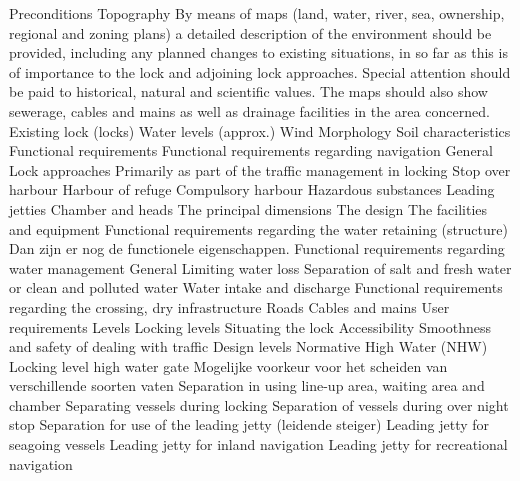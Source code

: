  

Preconditions
Topography
By means of maps (land, water, river, sea, ownership, regional and zoning plans) a detailed description
of the environment should be provided, including any planned changes to existing situations, in so far
as this is of importance to the lock and adjoining lock approaches. Special attention should be paid to
historical, natural and scientific values. The maps should also show sewerage, cables and mains as well
as drainage facilities in the area concerned.
Existing lock (locks)
Water levels (approx.)
Wind
Morphology
Soil characteristics
Functional requirements
Functional requirements regarding navigation
General
Lock approaches
Primarily as part of the traffic management in locking
Stop over harbour
Harbour of refuge
Compulsory harbour
Hazardous substances
Leading jetties
Chamber and heads
The principal dimensions
The design
The facilities and equipment
Functional requirements regarding the water retaining (structure)
\newline \indent Dan zijn er nog de functionele eigenschappen.
 Functional requirements regarding water management
General
Limiting water loss
Separation of salt and fresh water or clean and polluted water
Water intake and discharge
\newline \indent Functional requirements regarding the crossing, dry infrastructure
Roads
Cables and mains
\newline \indent  User requirements
\newline \indent Levels
Locking levels
Situating the lock
Accessibility
Smoothness and safety of dealing with traffic
Design levels
Normative High Water (NHW)
Locking level high water gate
\newline \indent Mogelijke voorkeur voor het scheiden van verschillende soorten vaten
Separation in using line-up area, waiting area and chamber
Separating vessels during locking
Separation of vessels during over night stop
Separation for use of the leading jetty (leidende steiger)
Leading jetty for seagoing vessels
Leading jetty for inland navigation
Leading jetty for recreational navigation
